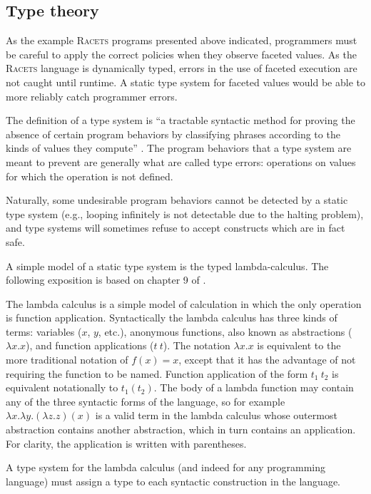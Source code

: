 \documentclass{article}
\begin{document}
\subsection{Type theory}
As the example \textsc{Racets} programs presented above indicated, programmers must be careful to apply the correct policies when they observe faceted values. As the \textsc{Racets} language is dynamically typed, errors in the use of faceted execution are not caught until runtime. A static type system for faceted values would be able to more reliably catch programmer errors.

The definition of a type system is ``a tractable syntactic method for proving the absence of certain program behaviors by classifying phrases according to the kinds of values they compute'' \cite{types}. The program behaviors that a type system are meant to prevent are generally what are called type errors: operations on values for which the operation is not defined.

Naturally, some undesirable program behaviors cannot be detected by a static type system (e.g., looping infinitely is not detectable due to the halting problem), and type systems will sometimes refuse to accept constructs which are in fact safe.

A simple model of a static type system is the typed lambda-calculus. The following exposition is based on chapter 9 of \cite{types}.

The lambda calculus is a simple model of calculation in which the only operation is function application. Syntactically the lambda calculus has three kinds of terms: variables ($x$, $y$, etc.), anonymous functions, also known as abstractions ($\lambda x . x$), and function applications ($t\ t$). The notation $\lambda x . x$ is equivalent to the more traditional notation of $f(x) = x$, except that it has the advantage of not requiring the function to be named. Function application of the form $t_1\ t_2$ is equivalent notationally to $t_1(t_2)$. The body of a lambda function may contain any of the three syntactic forms of the language, so for example $\lambda x . \lambda y . (\lambda z . z)(x)$ is a valid term in the lambda calculus whose outermost abstraction contains another abstraction, which in turn contains an application. For clarity, the application is written with parentheses.

A type system for the lambda calculus (and indeed for any programming language) must assign a type to each syntactic construction in the language.
\end{document}
